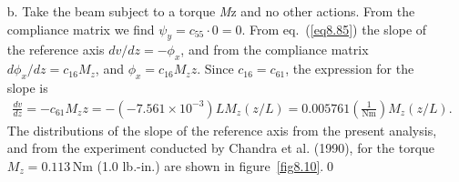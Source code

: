 \documentclass{AeroStructure-ERJohnson}
\begin{document}
\begin{example*}
\begin{enumerate}[a.]

\item[b.] Take the beam subject to a torque \textit{M}z and no other
actions. From the compliance matrix we find $\psi_{y}=c_{55} \cdot
0=0$. From eq.~(\ref{eq8.85}) the slope of the reference axis $d v
/ d z=-\phi_{x}$, and from the compliance matrix $d \phi_{x}/ d
z=c_{16} M_{z}$, and $\phi_{x}=c_{16} M_{z} z$. Since
$c_{16}=c_{61}$, the expression for the slope is
\begin{align*}
\frac{d v}{d
z}=-c_{61} M_{z} z=-(-7.561 \times 10^{-3}) L M_{z}(z/
L)=0.005761\left(\frac{1}{\mathrm{Nm}}\right) M_{z}(z/ L).
\end{align*}
The distributions of the slope of the reference axis from the
present analysis, and from the experiment conducted by Chandra et
al. (1990), for the torque $M_{z}=0.113\,\mathrm{Nm}$ (1.0 lb.-in.)
are shown in figure~\ref{fig8.10}.\quad\qed
\end{enumerate}
\end{example*}

\end{document}
